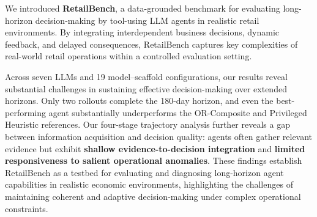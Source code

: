We introduced \textbf{RetailBench}, a data-grounded benchmark for evaluating long-horizon decision-making by tool-using LLM agents in realistic retail environments. By integrating interdependent business decisions, dynamic feedback, and delayed consequences, RetailBench captures key complexities of real-world retail operations within a controlled evaluation setting.

Across seven LLMs and 19 model--scaffold configurations, our results reveal substantial challenges in sustaining effective decision-making over extended horizons. Only two rollouts complete the 180-day horizon, and even the best-performing agent substantially underperforms the OR-Composite and Privileged Heuristic references. Our four-stage trajectory analysis further reveals a gap between information acquisition and decision quality: agents often gather relevant evidence but exhibit \textbf{shallow evidence-to-decision integration} and \textbf{limited responsiveness to salient operational anomalies}.
These findings establish RetailBench as a testbed for evaluating and diagnosing long-horizon agent capabilities in realistic economic environments, highlighting the challenges of maintaining coherent and adaptive decision-making under complex operational constraints.